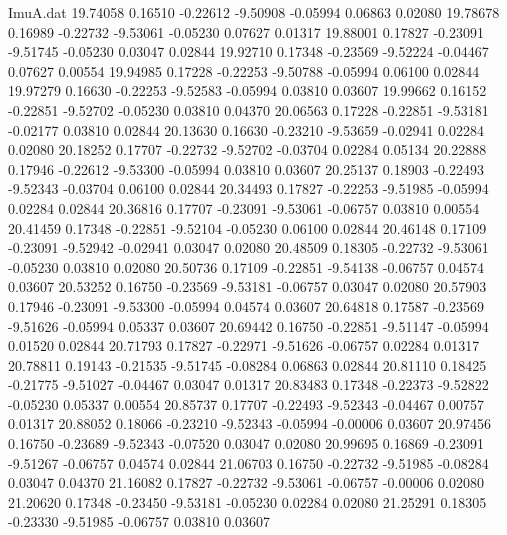 \begin{filecontents}{ImuA.dat}
  19.74058    0.16510   -0.22612   -9.50908   -0.05994    0.06863    0.02080
  19.78678    0.16989   -0.22732   -9.53061   -0.05230    0.07627    0.01317
  19.88001    0.17827   -0.23091   -9.51745   -0.05230    0.03047    0.02844
  19.92710    0.17348   -0.23569   -9.52224   -0.04467    0.07627    0.00554
  19.94985    0.17228   -0.22253   -9.50788   -0.05994    0.06100    0.02844
  19.97279    0.16630   -0.22253   -9.52583   -0.05994    0.03810    0.03607
  19.99662    0.16152   -0.22851   -9.52702   -0.05230    0.03810    0.04370
  20.06563    0.17228   -0.22851   -9.53181   -0.02177    0.03810    0.02844
  20.13630    0.16630   -0.23210   -9.53659   -0.02941    0.02284    0.02080
  20.18252    0.17707   -0.22732   -9.52702   -0.03704    0.02284    0.05134
  20.22888    0.17946   -0.22612   -9.53300   -0.05994    0.03810    0.03607
  20.25137    0.18903   -0.22493   -9.52343   -0.03704    0.06100    0.02844
  20.34493    0.17827   -0.22253   -9.51985   -0.05994    0.02284    0.02844
  20.36816    0.17707   -0.23091   -9.53061   -0.06757    0.03810    0.00554
  20.41459    0.17348   -0.22851   -9.52104   -0.05230    0.06100    0.02844
  20.46148    0.17109   -0.23091   -9.52942   -0.02941    0.03047    0.02080
  20.48509    0.18305   -0.22732   -9.53061   -0.05230    0.03810    0.02080
  20.50736    0.17109   -0.22851   -9.54138   -0.06757    0.04574    0.03607
  20.53252    0.16750   -0.23569   -9.53181   -0.06757    0.03047    0.02080
  20.57903    0.17946   -0.23091   -9.53300   -0.05994    0.04574    0.03607
  20.64818    0.17587   -0.23569   -9.51626   -0.05994    0.05337    0.03607
  20.69442    0.16750   -0.22851   -9.51147   -0.05994    0.01520    0.02844
  20.71793    0.17827   -0.22971   -9.51626   -0.06757    0.02284    0.01317
  20.78811    0.19143   -0.21535   -9.51745   -0.08284    0.06863    0.02844
  20.81110    0.18425   -0.21775   -9.51027   -0.04467    0.03047    0.01317
  20.83483    0.17348   -0.22373   -9.52822   -0.05230    0.05337    0.00554
  20.85737    0.17707   -0.22493   -9.52343   -0.04467    0.00757    0.01317
  20.88052    0.18066   -0.23210   -9.52343   -0.05994   -0.00006    0.03607
  20.97456    0.16750   -0.23689   -9.52343   -0.07520    0.03047    0.02080
  20.99695    0.16869   -0.23091   -9.51267   -0.06757    0.04574    0.02844
  21.06703    0.16750   -0.22732   -9.51985   -0.08284    0.03047    0.04370
  21.16082    0.17827   -0.22732   -9.53061   -0.06757   -0.00006    0.02080
  21.20620    0.17348   -0.23450   -9.53181   -0.05230    0.02284    0.02080
  21.25291    0.18305   -0.23330   -9.51985   -0.06757    0.03810    0.03607

\end{filecontents}
